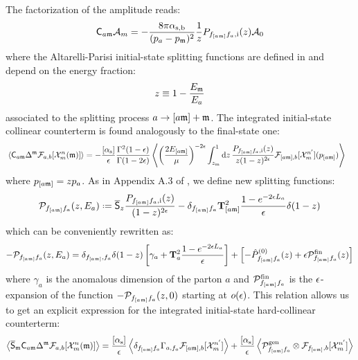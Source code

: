 The factorization of the amplitude reads:
\begin{equation}
\mathsf{C}_{a\mathfrak{m}} \mathcal{A}_m = - \frac{8\pi \alpha_\text{s,b}}{(p_a - p_{\mathfrak{m}})^2} \frac{1}{z} P_{f_{[a\mathfrak{m}]}f_a , \text{i}}(z) \mathcal{A}_0
\end{equation}
where the Altarelli-Parisi initial-state splitting functions are defined in  and depend on the energy fraction:
\begin{equation}
  z \equiv 1 - \frac{E_{\mathfrak{m}}}{E_a}
\end{equation}
associated to the splitting process $ a \rightarrow [a\mathfrak{m}] + \mathfrak{m} $. The integrated initial-state collinear counterterm is found analogously to the final-state one:
\begin{equation*}
  \begin{split}
    & \left\langle \mathsf{C}_{a\mathfrak{m}} \Delta^{\mathfrak{m}} \mathcal{F}_{a,b}[\mathcal{X}^{n}_{m}(\mathfrak{m})] \right\rangle = - \frac{[\alpha_\text{s}]}{\epsilon} \frac{\Gamma^2(1-\epsilon)}{\Gamma(1-2\epsilon)} \left\langle \left( \frac{2E_{[a\mathfrak{m}]}}{\mu} \right)^{-2\epsilon} \int_{z_\text{m}}^1 \mathrm{d} z\, \frac{P_{f_{[a\mathfrak{m}]} f_a , \text{i}}(z)}{z (1-z)^{2\epsilon}} \mathcal{F}_{[a\mathfrak{m}],b}[\mathcal{X}^{n'}_{m}](p_{[a\mathfrak{m}]}) \right\rangle
  \end{split}
\end{equation*}
where $ p_{[a\mathfrak{m}]} = z p_a $. As in Appendix A.3 of \cite{rontsch-2503}, we define new splitting functions:
\begin{equation}
  \nspl_{f_{[a\ur]}f_a}(z, E_a) \defeq \oso_z \frac{P_{f_{[a\ur]}f_a , \text{i}}(z)}{(1-z)^{2\de}} - \delta_{f_{[a\ur]}f_a} \tco_{[a\ur]}^2 \frac{1 - e^{-2\de L_a}}{\de} \delta(1-z)
\end{equation}
which can be conveniently rewritten as:
\begin{equation}
  - \mathcal{P}_{f_{[a\mathfrak{m}]} f_a}(z, E_a) = \delta_{f_{[a\mathfrak{m}]} , f_a} \delta(1-z) \left[ \gamma_a + \mathbf{T}_a^2 \frac{1 - e^{-2\epsilon L_a}}{\epsilon} \right] + \left[ - \hat{P}^{(0)}_{f_{[a\mathfrak{m}]} f_a}(z) + \epsilon \mathcal{P}^\text{fin}_{f_{[a\mathfrak{m}]} f_a}(z) \right]
\end{equation}
where $ \gamma_a $ is the anomalous dimension of the parton $ a $ and $ \mathcal{P}^\text{fin}_{f_{[a\mathfrak{m}]} f_a} $ is the $ \epsilon $-expansion of the function $ - \mathcal{P}_{f_{[a\mathfrak{m}]} f_a}(z, 0) $ starting at $ o(\epsilon) $. This relation allows us to get an explicit expression for the integrated initial-state hard-collinear counterterm:
\begin{equation}
  \left\langle \overline{\mathsf{S}}_{\mathfrak{m}} \mathsf{C}_{a\mathfrak{m}} \Delta^{\mathfrak{m}} \mathcal{F}_{a,b}[\mathcal{X}^{n}_{m}(\mathfrak{m})] \right\rangle = \frac{[\alpha_\text{s}]}{\epsilon} \left\langle \delta_{f_{[a\mathfrak{m}]}f_a} \Gamma_{a,f_a} \mathcal{F}_{[a\mathfrak{m}],b}[\mathcal{X}^{n'}_{m}] \right\rangle + \frac{[\alpha_\text{s}]}{\epsilon} \left\langle \mathcal{P}^\text{gen}_{f_{[a\mathfrak{m}]}f_a} \otimes \mathcal{F}_{f_{[a\mathfrak{m}]},b}[\mathcal{X}^{n'}_{m}] \right\rangle
  \label{eq:hc-is}
\end{equation}
